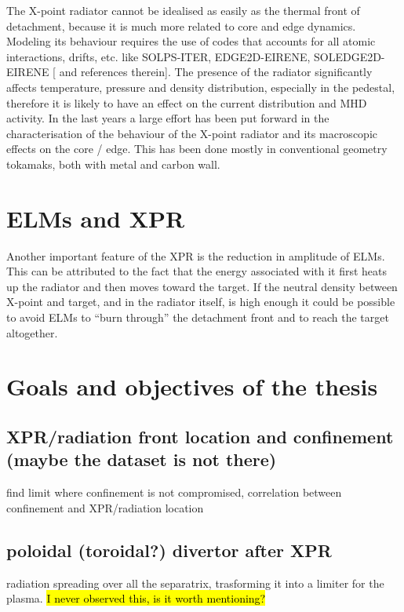 The X-point radiator cannot be idealised as easily as the thermal front of detachment, because it is much more related to core and edge dynamics. Modeling its behaviour requires the use of codes that accounts for all atomic interactions, drifts, etc. like SOLPS-ITER, EDGE2D-EIRENE, SOLEDGE2D-EIRENE [\cite{Wiesen2017a} and references therein]. The presence of the radiator significantly affects temperature, pressure and density distribution, especially in the pedestal, therefore it is likely to have an effect on the current distribution and MHD activity.
In the last years a large effort has been put forward in the characterisation of the behaviour of the X-point radiator and its macroscopic effects on the core / edge. This has been done mostly in conventional geometry tokamaks, both with metal and carbon wall.


\section{ELMs and XPR}
Another important feature of the XPR is the reduction in amplitude of ELMs. This can be attributed to the fact that the energy associated with it first heats up the radiator and then moves toward the target. If the neutral density between X-point and target, and in the radiator itself, is high enough it could be possible to avoid ELMs to “burn through” the detachment front and to reach the target altogether. \cite{Krasheninnikov2016}







\section{Goals and objectives of the thesis}

\subsection{XPR/radiation front location and confinement (maybe the dataset is not there)}
find limit where confinement is not compromised, correlation between confinement and XPR/radiation location
\subsection{poloidal (toroidal?) divertor after XPR}
radiation spreading over all the separatrix, trasforming it into a limiter for the plasma.
\hl{I never observed this, is it worth mentioning?}
